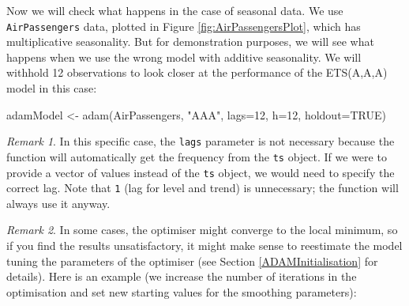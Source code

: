 \documentclass[
]{book}
\newenvironment{Shaded}{\begin{snugshade}}{\end{snugshade}}
\newcommand{\AttributeTok}[1]{\textcolor[rgb]{0.77,0.63,0.00}{#1}}
\newcommand{\ConstantTok}[1]{\textcolor[rgb]{0.00,0.00,0.00}{#1}}
\newcommand{\DecValTok}[1]{\textcolor[rgb]{0.00,0.00,0.81}{#1}}
\newcommand{\FloatTok}[1]{\textcolor[rgb]{0.00,0.00,0.81}{#1}}
\newcommand{\FunctionTok}[1]{\textcolor[rgb]{0.00,0.00,0.00}{#1}}
\newcommand{\NormalTok}[1]{#1}
\newcommand{\OtherTok}[1]{\textcolor[rgb]{0.56,0.35,0.01}{#1}}
\newcommand{\SpecialCharTok}[1]{\textcolor[rgb]{0.00,0.00,0.00}{#1}}
\newcommand{\StringTok}[1]{\textcolor[rgb]{0.31,0.60,0.02}{#1}}
\theoremstyle{definition}
\theoremstyle{definition}
\theoremstyle{definition}
\theoremstyle{definition}
\theoremstyle{remark}
\newtheorem*{remark}{Remark}
\begin{document}
Now we will check what happens in the case of seasonal data. We use \texttt{AirPassengers} data, plotted in Figure \ref{fig:AirPassengersPlot}, which has multiplicative seasonality. But for demonstration purposes, we will see what happens when we use the wrong model with additive seasonality. We will withhold 12 observations to look closer at the performance of the ETS(A,A,A) model in this case:

\begin{Shaded}
\begin{Highlighting}[]
\NormalTok{adamModel }\OtherTok{\textless{}{-}} \FunctionTok{adam}\NormalTok{(AirPassengers, }\StringTok{"AAA"}\NormalTok{, }\AttributeTok{lags=}\DecValTok{12}\NormalTok{,}
                  \AttributeTok{h=}\DecValTok{12}\NormalTok{, }\AttributeTok{holdout=}\ConstantTok{TRUE}\NormalTok{)}
\end{Highlighting}
\end{Shaded}

\begin{remark}
In this specific case, the \texttt{lags} parameter is not necessary because the function will automatically get the frequency from the \texttt{ts} object. If we were to provide a vector of values instead of the \texttt{ts} object, we would need to specify the correct lag. Note that \texttt{1} (lag for level and trend) is unnecessary; the function will always use it anyway.
\end{remark}

\begin{remark}
In some cases, the optimiser might converge to the local minimum, so if you find the results unsatisfactory, it might make sense to reestimate the model tuning the parameters of the optimiser (see Section \ref{ADAMInitialisation} for details). Here is an example (we increase the number of iterations in the optimisation and set new starting values for the smoothing parameters):
\end{remark}

\begin{Shaded}
\end{Shaded}
\end{document}
